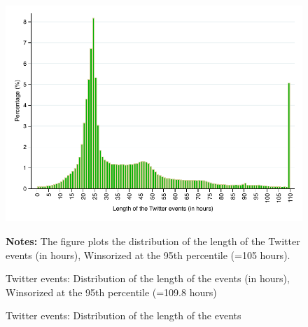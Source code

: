 \clearpage
\pagebreak
\begin{figure}
\begin{center}
\includegraphics[scale=1]{figures/distribution_length_Tevents}
\end{center}
	\begin{spacing}{0.5}
		{\footnotesize \textbf{Notes:} The figure plots the distribution of the length of the Twitter events (in hours), Winsorized at the 95th percentile (=105 hours). }
	\end{spacing}
\vspace{.5cm}	
	\caption{Twitter events: Distribution of the length of the events}{ Twitter events: Distribution of the length of the events (in hours),
Winsorized at the 95th percentile (=109.8 hours)}
	\label{fig:distribution_length_Tevents}
\end{figure}



\clearpage 
\pagebreak